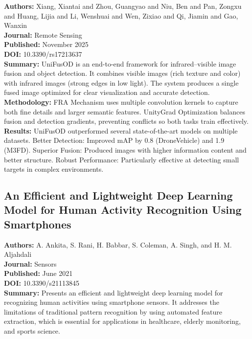\textbf{Authors:} Xiang, Xiantai and Zhou, Guangyao and Niu, Ben and Pan, Zongxu and Huang, Lijia
and Li, Wenshuai and Wen, Zixiao and Qi, Jiamin and Gao, Wanxin \\
\textbf{Journal:} Remote Sensing \\
\textbf{Published:} November 2025 \\
\textbf{DOI:} 10.3390/rs17213637 \\

\textbf{Summary:} UniFusOD is an end-to-end framework for infrared–visible image fusion and object
detection. It combines visible images (rich texture and color) with infrared images (strong edges in
low light). The system produces a single fused image optimized for clear visualization and accurate
detection. \\

\textbf{Methodology:} FRA Mechanism uses multiple convolution kernels to capture both fine details
and larger semantic features. UnityGrad Optimization balances fusion and detection gradients,
preventing conflicts so both tasks train effectively. \\

\textbf{Results:} UniFusOD outperformed several state-of-the-art models on multiple datasets. Better
Detection: Improved mAP by 0.8 (DroneVehicle) and 1.9 (M3FD). Superior Fusion: Produced images with
higher information content and better structure. Robust Performance: Particularly effective at
detecting small targets in complex environments.

\subsection{An Efficient and Lightweight Deep Learning Model for Human Activity Recognition Using
  Smartphones}

\textbf{Authors:} A. Ankita, S. Rani, H. Babbar, S. Coleman, A. Singh, and H. M. Aljahdali \\
\textbf{Journal:} Sensors \\
\textbf{Published:} June 2021 \\
\textbf{DOI:} 10.3390/s21113845 \\

\textbf{Summary:} Presents an efficient and lightweight deep learning model for recognizing human
activities using smartphone sensors. It addresses the limitations of traditional pattern recognition
by using automated feature extraction, which is essential for applications in healthcare, elderly
monitoring, and sports science. \\

